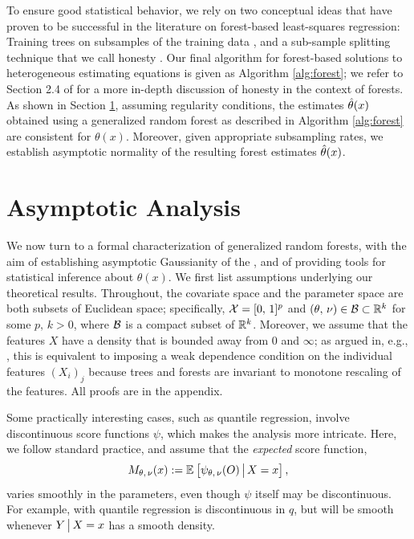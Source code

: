 \documentclass[aos]{imsart}
\theoremstyle{plain}
\theoremstyle{definition}
\theoremstyle{remark}
\begin{document}
\begin{CJK}{UTF8}{gbsn}
To ensure good statistical behavior,
we rely on two conceptual ideas that have proven to be successful in the literature
on forest-based least-squares regression: Training trees on subsamples of the training data
\citep{mentch2016quantifying,scornet2015consistency,wager2015estimation}, and a sub-sample
splitting technique that we call honesty \citep{biau2012analysis,denil2014narrowing,wager2015estimation}.
Our final algorithm for forest-based solutions to heterogeneous estimating equations is given as
Algorithm \ref{alg:forest}; we refer to Section 2.4 of \citet{wager2015estimation} for a more in-depth discussion
of honesty in the context of forests.
As shown in Section \ref{sec:theory}, 
assuming regularity conditions, the estimates $\hat{\theta}(x)$ obtained using
a generalized random forest as described in Algorithm \ref{alg:forest} are consistent for $\theta(x)$.
Moreover, given appropriate subsampling rates, we establish asymptotic normality of the resulting forest estimates $\hat{\theta}(x)$.


\section{Asymptotic Analysis}
\label{sec:theory}


We now turn to a formal characterization of generalized random forests, with the aim of
establishing asymptotic Gaussianity of the , and of providing
tools for statistical inference about $\theta(x)$.
We first list assumptions underlying our theoretical results.
Throughout, the covariate space and the parameter space are both subsets of Euclidean space;
specifically, $\mathcal{X} = [0, \, 1]^p$ and $(\theta, \, \nu) \in \mathcal{B} \subset \mathbb{R}^k$
for some $p, \, k > 0$, where $\mathcal{B}$ is a compact subset of $\mathbb{R}^k$.
Moreover, we assume that the features $X$ have a density that is bounded away from 0 and $\infty$; as
argued in, e.g., \citet{wager2015uniform}, this is equivalent to imposing a weak dependence condition on the
individual features $(X_i)_j$ because trees and forests are invariant to monotone rescaling of the features.
All proofs are in the appendix.

Some practically interesting cases, such as quantile regression, involve discontinuous score functions $\psi$,
which makes the analysis more intricate. Here, we follow standard practice, and
assume that the \emph{expected} score function,
\begin{equation}
\label{eq:M}
M_{\theta, \, \nu}(x) := \EE{\psi_{\theta, \, \nu}(O) \cond X = x},
\end{equation}
varies smoothly in the parameters, even though $\psi$ itself may be
discontinuous. For example, with quantile regression
 is discontinuous in $q$,
but  will be smooth
whenever $Y\,\big|\, X = x$ has a smooth density.


\end{CJK}
\end{document}
